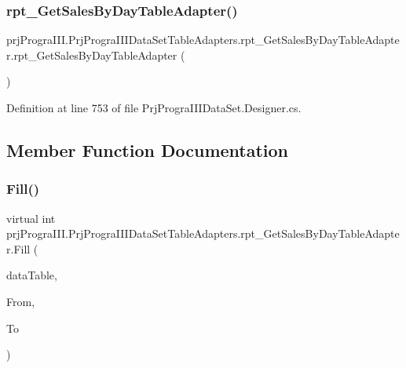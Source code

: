 \subsubsection{\texorpdfstring{rpt\+\_\+\+Get\+Sales\+By\+Day\+Table\+Adapter()}{rpt\_GetSalesByDayTableAdapter()}}
{\footnotesize\ttfamily prj\+Progra\+I\+I\+I.\+Prj\+Progra\+I\+I\+I\+Data\+Set\+Table\+Adapters.\+rpt\+\_\+\+Get\+Sales\+By\+Day\+Table\+Adapter.\+rpt\+\_\+\+Get\+Sales\+By\+Day\+Table\+Adapter (\begin{DoxyParamCaption}{ }\end{DoxyParamCaption})}



Definition at line 753 of file Prj\+Progra\+I\+I\+I\+Data\+Set.\+Designer.\+cs.



\subsection{Member Function Documentation}
\hypertarget{classprj_progra_i_i_i_1_1_prj_progra_i_i_i_data_set_table_adapters_1_1rpt___get_sales_by_day_table_adapter_a6df847794448ca89947ab4a30edfe891}{}\label{classprj_progra_i_i_i_1_1_prj_progra_i_i_i_data_set_table_adapters_1_1rpt___get_sales_by_day_table_adapter_a6df847794448ca89947ab4a30edfe891} 
\subsubsection{\texorpdfstring{Fill()}{Fill()}}
{\footnotesize\ttfamily virtual int prj\+Progra\+I\+I\+I.\+Prj\+Progra\+I\+I\+I\+Data\+Set\+Table\+Adapters.\+rpt\+\_\+\+Get\+Sales\+By\+Day\+Table\+Adapter.\+Fill (\begin{DoxyParamCaption}\item[{\hyperlink{classprj_progra_i_i_i_1_1_prj_progra_i_i_i_data_set_1_1rpt___get_sales_by_day_data_table}{Prj\+Progra\+I\+I\+I\+Data\+Set.\+rpt\+\_\+\+Get\+Sales\+By\+Day\+Data\+Table}}]{data\+Table,  }\item[{global\+::\+System.\+Nullable$<$ global\+::\+System.\+Date\+Time $>$}]{From,  }\item[{global\+::\+System.\+Nullable$<$ global\+::\+System.\+Date\+Time $>$}]{To }\end{DoxyParamCaption})\hspace{0.3cm}{\ttfamily [virtual]}}



